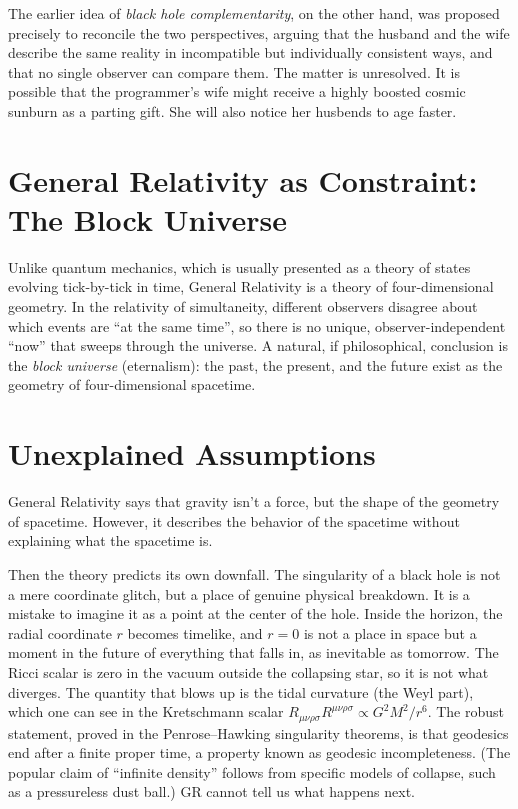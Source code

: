 The earlier idea of \emph{black hole complementarity}, on the other hand, was proposed precisely to reconcile the two perspectives, 
arguing that the husband and the wife describe the same reality in incompatible but individually consistent ways, and that no single observer can compare them.
The matter is unresolved. It is possible that the programmer's wife might receive a highly boosted cosmic sunburn as a parting gift.
She will also notice her husbends to age faster. 



\section*{General Relativity as Constraint: The Block Universe}

Unlike quantum mechanics, which is usually presented as a theory of states evolving tick-by-tick in time, General Relativity is a theory of four-dimensional geometry.
In the relativity of simultaneity, different observers disagree about which events are ``at the same time'', so there is no unique, observer-independent ``now'' that sweeps through the universe.
A natural, if philosophical, conclusion is the \emph{block universe} (eternalism): the past, the present, and the future exist as the 
geometry of four-dimensional spacetime. 




\section*{Unexplained Assumptions}

General Relativity says that gravity isn't a force, but the shape of the geometry of spacetime.
However, it describes the behavior of the spacetime without explaining what the spacetime is. 

Then the theory predicts its own downfall. The singularity of a black hole is not a mere coordinate glitch, 
but a place of genuine physical breakdown. It is a mistake to imagine it as a point at the center of the hole.
Inside the horizon, the radial coordinate $r$ becomes timelike, and $r=0$ is not a place in space but a moment in the future of everything that falls in, as inevitable as tomorrow.
The Ricci scalar is zero in the vacuum outside the collapsing star, so it is not what diverges.
The quantity that blows up is the tidal curvature (the Weyl part), which one can see in the Kretschmann scalar $R_{\mu\nu\rho\sigma}R^{\mu\nu\rho\sigma} \propto G^2M^2/r^6$.
The robust statement, proved in the Penrose--Hawking singularity theorems, is that geodesics end after a finite proper time, a property known as geodesic incompleteness.
(The popular claim of ``infinite density'' follows from specific models of collapse, such as a pressureless dust ball.)
GR cannot tell us what happens next.

